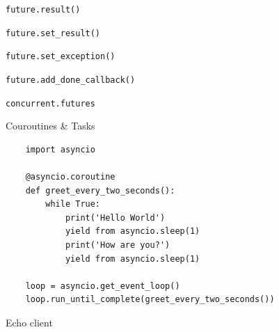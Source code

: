 \documentclass[20pt]{beamer}
\renewcommand\emph[1]{\textcolor{taskyblue}{#1}}
\begin{document}
\begin{center}
{    \pause
    \texttt{future.result()}

    \pause
    \texttt{future.set\_result()}

    \pause
    \texttt{future.set\_exception()}

    \pause
    \texttt{future.add\_done\_callback()}

    \bigskip
    \pause
    \texttt{concurrent.futures}
}


\begin{frame}[fragile]
    \emph{Couroutines} \& Tasks

    \tiny
    \begin{verbatim}
    import asyncio

    @asyncio.coroutine
    def greet_every_two_seconds():
        while True:
            print('Hello World')
            yield from asyncio.sleep(1)
            print('How are you?')
            yield from asyncio.sleep(1)

    loop = asyncio.get_event_loop()
    loop.run_until_complete(greet_every_two_seconds())
    \end{verbatim}

\end{frame}


\begin{frame}[fragile]
    Echo client


\end{frame}
\end{center}
\end{document}
